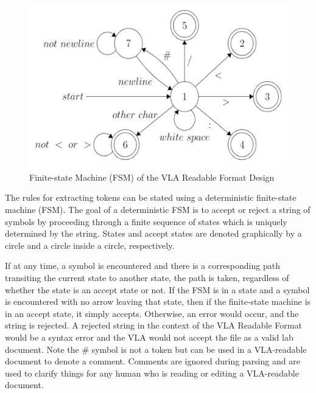 \documentclass[11.5pt]{sig-alternate} %
\begin{document}
\begin{large}
\begin{figure}[h]
    \centering
    \includegraphics[width=1\linewidth]{fig3.png}
    \caption{Finite-state Machine (FSM) of the VLA Readable Format Design}
\end{figure}

The rules for extracting tokens can be stated using a deterministic finite-state machine (FSM). The goal of a deterministic FSM is to accept or reject a string of symbols by proceeding through a finite sequence of states which is uniquely determined by the string. States and accept states are denoted graphically by a circle and a circle inside a circle, respectively.

If at any time, a symbol is encountered and there is a corresponding path transiting the current state to another state, the path is taken, regardless of whether the state is an accept state or not. If the FSM is in a state and a symbol is encountered with no arrow leaving that state, then if the finite-state machine is in an accept state, it simply accepts. Otherwise, an error would occur, and the string is rejected. A rejected string in the context of the VLA Readable Format would be a syntax error and the VLA would not accept the file as a valid lab document. Note the \# symbol is not a token but can be used in a VLA-readable document to denote a comment. Comments are ignored during parsing and are used to clarify things for any human who is reading or editing a VLA-readable document.


\end{large}
\end{document}
